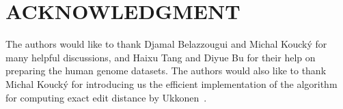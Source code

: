 \documentclass[11pt,notitlepage]{article}
\begin{document}










\section{ACKNOWLEDGMENT}
The authors would like to thank Djamal Belazzougui and Michal Kouck\'y for many helpful discussions, and Haixu Tang and Diyue Bu for their help on preparing the human genome datasets.  The authors would also like to thank Michal Kouck\'y for introducing us the efficient implementation of the algorithm for computing exact edit distance by Ukkonen~\cite{Ukkonen85}.


 




%
\end{document}
